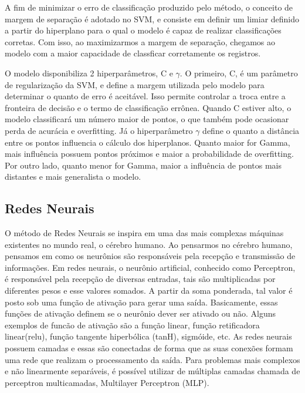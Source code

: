 \documentclass{homework}
\begin{document}
A fim de minimizar o erro de classificação produzido pelo método, o conceito de margem de separação é adotado no SVM, e
consiste em definir um limiar definido a partir do hiperplano para o qual o modelo é capaz de realizar classificações
corretas. Com isso, ao maximizarmos a margem de separação, chegamos ao modelo com a maior capacidade de classficar
corretamente os registros.

O modelo disponibiliza 2 hiperparâmetros, C e $\gamma$. O primeiro, C, é um parâmetro de regularização da SVM, e define a
margem utilizada pelo modelo para determinar o quanto de erro é aceitável. Isso permite controlar a troca entre a
fronteira de decisão e o termo de classificação errônea. Quando C estiver alto, o modelo classificará um número maior de
pontos, o que também pode ocasionar perda de acurácia e overfitting. Já o hiperparâmetro $\gamma$ define o quanto a
distância entre os pontos influencia o cálculo dos hiperplanos. Quanto maior for Gamma, mais influência possuem pontos
próximos e maior a probabilidade de overfitting. Por outro lado, quanto menor for Gamma, maior a influência de pontos
mais distantes e mais generalista o modelo.

\subsection{Redes Neurais}

O método de Redes Neurais se inspira em uma das mais complexas máquinas existentes no mundo real, o cérebro humano. Ao pensarmos no cérebro humano, pensamos em como os neurônios são responsáveis pela recepção e transmissão de informações. Em redes neurais, o neurônio artificial, conhecido como Perceptron, é responsável pela recepção de diversas entradas, tais são multiplicadas por diferentes pesos e esse valores somados. A partir da soma ponderada, tal valor é posto sob uma função de ativação para gerar uma saída. Basicamente, essas funções de ativação definem se o neurônio dever ser ativado ou não. Alguns exemplos de funcão de ativação são a função linear, função retificadora linear(relu), função tangente hiperbólica (tanH), sigmóide, etc. As redes neurais possuem camadas e essas são conectadas de forma que as suas conexões formam uma rede que realizam o processamento da saída. Para problemas mais complexos e não linearmente separáveis, é possível utilizar de múltiplas camadas chamada de perceptron multicamadas, Multilayer Perceptron (MLP).
\end{document}
